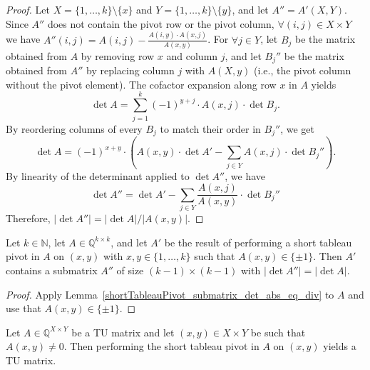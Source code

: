 \begin{proof}
    \leanok
    Let $X = \{1, \dots, k\} \setminus \{x\}$ and $Y = \{1, \dots, k\} \setminus \{y\}$, and let $A'' = A' (X, Y)$. Since $A''$ does not contain the pivot row or the pivot column, $\forall (i, j) \in X \times Y$ we have $A'' (i, j) = A (i, j) - \frac{A (i, y) \cdot A (x, j)}{A (x, y)}$. For $\forall j \in Y$, let $B_{j}$ be the matrix obtained from $A$ by removing row $x$ and column $j$, and let $B_{j}''$ be the matrix obtained from $A''$ by replacing column $j$ with $A (X, y)$ (i.e., the pivot column without the pivot element). The cofactor expansion along row $x$ in $A$ yields
    \[
        \det A = \sum_{j = 1}^{k} (-1)^{y + j} \cdot A (x, j) \cdot \det B_{j}.
    \]
    By reordering columns of every $B_{j}$ to match their order in $B_{j}''$, we get
    \[
        \det A = (-1)^{x + y} \cdot \left( A (x, y) \cdot \det A' - \sum_{j \in Y} A (x, j) \cdot \det B_{j}'' \right).
    \]
    By linearity of the determinant applied to $\det A''$, we have
    \[
        \det A'' = \det A' - \sum_{j \in Y} \frac{A (x, j)}{A (x, y)} \cdot \det B_{j}''
    \]
    Therefore, $|\det A''| = |\det A| / |A (x, y)|$.
\end{proof}

\begin{lemma}
    \label{shortTableauPivot_submatrix_det_ni_signTypeCastRange}
    \leanok
    Let $k \in \mathbb{N}$, let $A \in \mathbb{Q}^{k \times k}$, and let $A'$ be the result of performing a short tableau pivot in $A$ on $(x, y)$ with $x, y \in \{1, \dots, k\}$ such that $A (x, y) \in \{\pm 1\}$. Then $A'$ contains a submatrix $A''$ of size $(k - 1) \times (k - 1)$ with $|\det A''| = |\det A|$.
\end{lemma}

\begin{proof}
    \leanok
    Apply Lemma~\ref{shortTableauPivot_submatrix_det_abs_eq_div} to $A$ and use that $A (x, y) \in \{\pm 1\}$.
\end{proof}

\begin{lemma}
    \label{Matrix.IsTotallyUnimodular.shortTableauPivot}
    \leanok
    Let $A \in \mathbb{Q}^{X \times Y}$ be a TU matrix and let $(x, y) \in X \times Y$ be such that $A (x, y) \neq 0$. Then performing the short tableau pivot in $A$ on $(x, y)$ yields a TU matrix.
\end{lemma}

